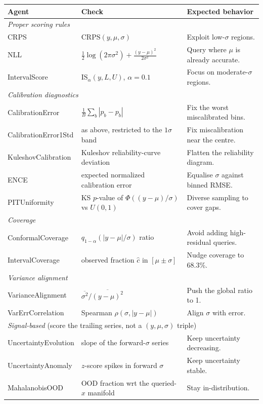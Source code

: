 \documentclass[11pt]{article}
\begin{document}
\begin{center}
\small
\begin{tabular}{p{} p{} p{}}
\toprule
\textbf{Agent} & \textbf{Check} & \textbf{Expected behavior} \\
\midrule
\multicolumn{3}{l}{\emph{Proper scoring rules}} \\
CRPS & $\mathrm{CRPS}(y, \mu, \sigma)$ & Exploit low-$\sigma$ regions. \\
NLL & $\tfrac{1}{2}\log(2\pi\sigma^2) + \tfrac{(y-\mu)^2}{2\sigma^2}$ & Query where $\mu$ is already accurate. \\
IntervalScore & $\mathrm{IS}_\alpha(y, L, U)$, $\alpha=0.1$ & Focus on moderate-$\sigma$ regions. \\
\midrule
\multicolumn{3}{l}{\emph{Calibration diagnostics}} \\
CalibrationError & $\frac{1}{B} \sum_b |\hat p_b - p_b|$ & Fix the worst miscalibrated bins. \\
CalibrationError1Std & as above, restricted to the $1\sigma$ band & Fix miscalibration near the centre. \\
KuleshovCalibration & Kuleshov reliability-curve deviation & Flatten the reliability diagram. \\
ENCE & expected normalized calibration error & Equalise $\sigma$ against binned RMSE. \\
PITUniformity & KS $p$-value of $\Phi((y-\mu)/\sigma)$ vs $U(0,1)$ & Diverse sampling to cover gaps. \\
\midrule
\multicolumn{3}{l}{\emph{Coverage}} \\
ConformalCoverage & $q_{1-\alpha}(|y-\mu|/\sigma)$ ratio & Avoid adding high-residual queries. \\
IntervalCoverage & observed fraction $\hat c$ in $[\mu \pm \sigma]$ & Nudge coverage to 68.3\%. \\
\midrule
\multicolumn{3}{l}{\emph{Variance alignment}} \\
VarianceAlignment & $\overline{\sigma^2} / \overline{(y-\mu)^2}$ & Push the global ratio to 1. \\
VarErrCorrelation & Spearman $\rho(\sigma, |y - \mu|)$ & Align $\sigma$ with error. \\
\midrule
\multicolumn{3}{l}{\emph{Signal-based} (score the trailing series, not a $(y,\mu,\sigma)$ triple)} \\
UncertaintyEvolution & slope of the forward-$\sigma$ series & Keep uncertainty decreasing. \\
UncertaintyAnomaly & $z$-score spikes in forward $\sigma$ & Keep uncertainty stable. \\
MahalanobisOOD & OOD fraction wrt the queried-$x$ manifold & Stay in-distribution. \\
\bottomrule
\end{tabular}
\end{center}
\end{document}
